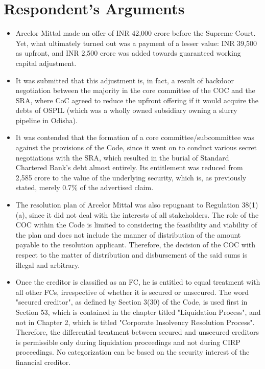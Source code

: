 \documentclass[12pt]{article}
\begin{document}
\section*{Respondent's Arguments}

\begin{itemize}
	\item Arcelor Mittal made an offer of INR 42,000 crore before the Supreme Court. Yet, what ultimately turned out was a payment of a lesser value: INR 39,500 as upfront, and INR 2,500 crore was added towards guaranteed working capital adjustment.

	\item It was submitted that this adjustment is, in fact, a result of backdoor negotiation between the majority in the core committee of the COC and the SRA, where CoC agreed to reduce the upfront offering if it would acquire the debts of OSPIL (which was a wholly owned subsidiary owning a slurry pipeline in Odisha).
	\item It was contended that the formation of a core committee/subcommittee was against the provisions of the Code, since it went on to conduct various secret negotiations with the SRA, which resulted in the burial of Standard Chartered Bank's debt almost entirely. Its entitlement was reduced from 2,585 crore to the value of the underlying security, which is, as previously stated, merely 0.7\% of the advertised claim.
	\item The resolution plan of Arcelor Mittal was also repugnant to Regulation 38(1)(a), since it did not deal with the interests of all stakeholders. The role of the COC within the Code is limited to considering the feasibility and viability of the plan and does not include the manner of distribution of the amount payable to the resolution applicant. Therefore, the decision of the COC with respect to the matter of distribution and disbursement of the said sums is illegal and arbitrary.
	\item Once the creditor is classified as an FC, he is entitled to equal treatment with all other FCs, irrespective of whether it is secured or unsecured. The word "secured creditor", as defined by Section 3(30) of the Code, is used first in Section 53, which is contained in the chapter titled "Liquidation Process", and not in Chapter 2, which is titled "Corporate Insolvency Resolution Process". Therefore, the differential treatment between secured and unsecured creditors is permissible only during liquidation proceedings and not during CIRP proceedings. No categorization can be based on the security interest of the financial creditor.
\end{itemize}
\end{document}
